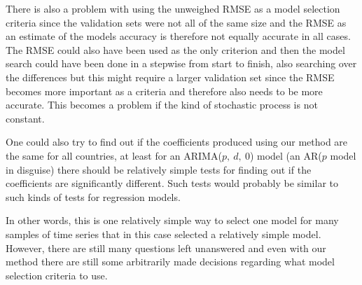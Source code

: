 \documentclass[a4paper, 12pt]{scrartcl}
\begin{document}
There is also a problem with using the unweighed RMSE as a model selection criteria since the validation sets were not all of the same size and the RMSE as an estimate of the models accuracy is therefore not equally accurate in all cases.
The RMSE could also have been used as the only criterion and then the model search could have been done in a stepwise from start to finish, also searching over the differences but this might require a larger validation set since the RMSE becomes more important as a criteria and therefore also needs to be more accurate.
This becomes a problem if the kind of stochastic process is not constant.

One could also try to find out if the coefficients produced using our method are the same for all countries, at least for an ARIMA($p,~d,~0$) model (an AR($p$ model in disguise) there should be relatively simple tests for finding out if the coefficients are significantly different.
Such tests would probably be similar to such kinds of tests for regression models.

In other words, this is one relatively simple way to select one model for many samples of time series that in this case selected a relatively simple model.
However, there are still many questions left unanswered and even with our method there are still some arbitrarily made decisions regarding what model selection criteria to use.

\newpage
\appendix
\appendixpage
\end{document}
